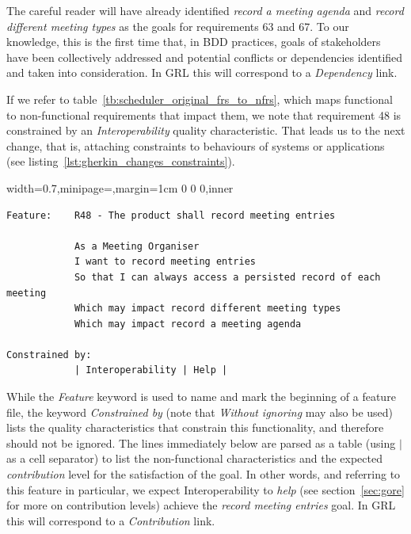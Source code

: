\documentclass[dissertation,final]{softeng}
\newenvironment{featurecode}[1]
{ \lrbox\featurebox \begin{adjustbox}{width=#1\textwidth,minipage=\textwidth,margin=1cm 0 0 0,inner} }
{ \end{adjustbox}\endlrbox}
\newenvironment{featurelist}[2]
{
\newcommand{\setcaption}{\caption{#1}}
\newcommand{\setlabel}{\label{#2}}
}
{\begin{listing}[h!]\centering\usebox\featurebox\setcaption\setlabel\end{listing}}
\begin{document}
The careful reader will have already identified \emph{record a meeting agenda} and \emph{record different meeting types} as the goals for requirements 63 and 67. To our knowledge, this is the first time that, in BDD practices, goals of stakeholders have been collectively addressed and potential conflicts or dependencies identified and taken into consideration. In GRL this will correspond to a \emph{Dependency} link.

If we refer to table~\ref{tb:scheduler_original_frs_to_nfrs}, which maps functional to non-functional requirements that impact them, we note that requirement 48 is constrained by an \emph{Interoperability} quality characteristic. That leads us to the next change, that is, attaching constraints to behaviours of systems or applications (see listing~\ref{lst:gherkin_changes_constraints}).

\begin{featurelist}{Changes to Gherkin -- Constraints}{lst:gherkin_changes_constraints}
\begin{featurecode}{0.7}
\begin{verbatim}
Feature:    R48 - The product shall record meeting entries

            As a Meeting Organiser
            I want to record meeting entries
            So that I can always access a persisted record of each meeting
            Which may impact record different meeting types
            Which may impact record a meeting agenda
	
Constrained by:
            | Interoperability | Help |
\end{verbatim}
\end{featurecode}
\end{featurelist}

While the \emph{Feature} keyword is used to name and mark the beginning of a feature file, the keyword \emph{Constrained by} (note that \emph{Without ignoring} may also be used) lists the quality characteristics that constrain this functionality, and therefore should not be ignored. The lines immediately below are parsed as a table (using $\vert$ as a cell separator) to list the non-functional characteristics and the expected \emph{contribution} level for the satisfaction of the goal. In other words, and referring to this feature in particular, we expect Interoperability to \emph{help} (see section~\ref{sec:gore} for more on contribution levels) achieve the \emph{record meeting entries} goal. In GRL this will correspond to a \emph{Contribution} link.
\end{document}
